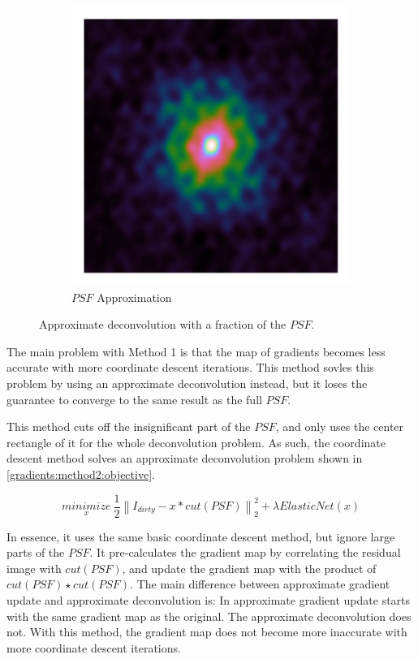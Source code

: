 \begin{figure}[h]
\begin{subfigure}[b]{0.3\linewidth}
		\includegraphics[width=\linewidth,clip, trim= 0.25in 0.25in 0.25in 0.25in]{./chapters/03.cd/simulated/psf.png}
		\caption{$PSF$ Approximation}
	\end{subfigure}
	
	\caption{Approximate deconvolution with a fraction of the $PSF$.}
\end{figure} 
The main problem with Method 1 is that the map of gradients becomes less accurate with more coordinate descent iterations. This method sovles this problem by using an approximate deconvolution instead, but it loses the guarantee to converge to the same result as the full $PSF$.

This method cuts off the insignificant part of the $PSF$, and only uses the center rectangle of it for the whole deconvolution problem. As such, the coordinate descent method solves an approximate deconvolution problem shown in \eqref{gradients:method2:objective}.

\begin{equation}\label{gradients:method2:objective}
\underset{x}{minimize} \: \frac{1}{2} \left \| I_{dirty} - x * cut(PSF) \right \|_2^2 + \lambda ElasticNet(x)
\end{equation}

In essence, it uses the same basic coordinate descent method, but ignore large parts of the $PSF$. It pre-calculates the gradient map by correlating the residual image with $cut(PSF)$, and update the gradient map with the product of $cut(PSF) \star cut(PSF)$. The main difference between approximate gradient update and approximate deconvolution is: In approximate gradient update starts with the same gradient map as the original. The approximate deconvolution does not. With this method, the gradient map does not become more inaccurate with more coordinate descent iterations.


